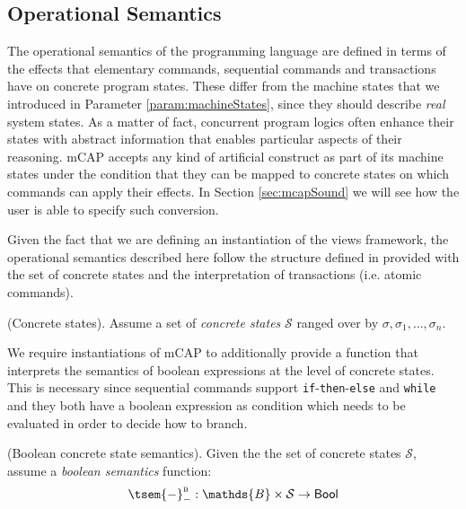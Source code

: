\subsection{Operational Semantics}
\label{sec:mcapOpSem}
The operational semantics of the programming language are defined in terms of the effects that elementary commands, sequential commands and transactions have on concrete program states. These differ from the machine states that we introduced in Parameter \ref{param:machineStates}, since they should describe \textit{real} system states. As a matter of fact, concurrent program logics often enhance their states with abstract information that enables particular aspects of their reasoning. mCAP accepts any kind of artificial construct as part of its machine states under the condition that they can be mapped to concrete states on which commands can apply their effects. In Section \ref{sec:mcapSound} we will see how the user is able to specify such conversion.

Given the fact that we are defining an instantiation of the views framework, the operational semantics described here follow the structure defined in \cite{views} provided with the set of concrete states and the interpretation of transactions (i.e. atomic commands).

\begin{param}
	(Concrete states).
	Assume a set of \emph{concrete states} $\mathcal{S}$ ranged over by $\sigma, \sigma_1, \ldots, \sigma_n$.
\end{param}

We require instantiations of mCAP to additionally provide a function that interprets the semantics of boolean expressions at the level of concrete states. This is necessary since sequential commands support \texttt{if}-\texttt{then}-\texttt{else} and \texttt{while} and they both have a boolean expression as condition which needs to be evaluated in order to decide how to branch.
\begin{param}
	\label{param:boolConcrete}
	(Boolean concrete state semantics).
	Given the the set of concrete states $\mathcal{S}$, assume a \emph{boolean semantics} function:
	\[
		\tsem{-}^\textsc{b}_- : \mathds{B} \times \mathcal{S} \rightarrow \mathsf{Bool}
	\]	
\end{param}

